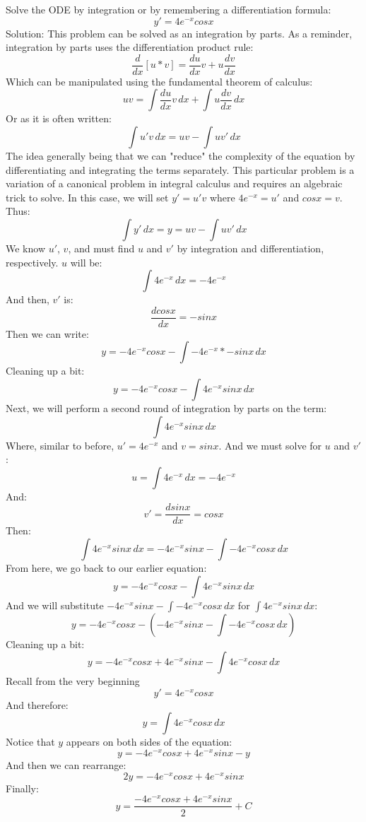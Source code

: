 \documentclass[12pt, letterpaper]{article}
\begin{document}
\setlength\parindent{0pt}
Solve the ODE by integration or by remembering a differentiation formula: 
\[ y' = 4e^{-x}cosx \]
Solution:
This problem can be solved as an integration by parts. As a reminder, integration by parts
uses the differentiation product rule:
\[ \frac{d}{dx}[u*v] = \frac{du}{dx}v + u\frac{dv}{dx} \]
Which can be manipulated using the fundamental theorem of calculus:
\[ uv = \int{\frac{du}{dx}v}\,dx + \int{u\frac{dv}{dx}}\,dx \]
Or as it is often written:
\[ \int{u'v}\,dx = uv - \int{uv'}\,dx \] 
The idea generally being that we can "reduce" the complexity of the equation by 
differentiating and integrating the terms separately. This particular problem is a 
variation of a canonical problem in integral calculus and requires an algebraic trick 
to solve.
In this case, we will set $y' = u'v$ where $4e^{-x} = u'$ and $cosx = v$. Thus:
\[ \int{y'}\,dx = y = uv - \int{uv'}\,dx \]
We know $u'$, $v$, and must find $u$ and $v'$ by integration and differentiation, 
respectively. $u$ will be:
\[ \int{4e^{-x}}\,dx = -4e^{-x} \]
And then, $v'$ is:
\[ \frac{dcosx}{dx} = -sinx \]
Then we can write:
\[ y = -4e^{-x}cosx - \int{-4e^{-x}*-sinx}\,dx \]
Cleaning up a bit:
\[ y = -4e^{-x}cosx - \int{4e^{-x}sinx}\,dx \]
Next, we will perform a second round of integration by parts on the term: 
\[ \int{4e^{-x}sinx}\,dx \]
Where, similar to before, $u' = 4e^{-x}$ and $v = sinx$. And we must solve for $u$ and $v'$:
\[ u = \int{4e^{-x}}\,dx = -4e^{-x} \]
And:
\[ v' = \frac{dsinx}{dx} = cosx \]
Then:
\[ \int{4e^{-x}sinx}\,dx = -4e^{-x}sinx - \int{-4e^{-x}cosx}\,dx \]
From here, we go back to our earlier equation:
\[ y = -4e^{-x}cosx - \int{4e^{-x}sinx}\,dx \]
And we will substitute $-4e^{-x}sinx - \int{-4e^{-x}cosx}\,dx$ for $\int{4e^{-x}sinx}\,dx$:
\[ y = -4e^{-x}cosx - (-4e^{-x}sinx - \int{-4e^{-x}cosx}\,dx) \]
Cleaning up a bit:
\[ y = -4e^{-x}cosx + 4e^{-x}sinx - \int{4e^{-x}cosx}\,dx \]
Recall from the very beginning 
\[ y' = 4e^{-x}cosx \]
And therefore:
\[ y = \int{4e^{-x}cosx}\,dx\]
Notice that $y$ appears on both sides of the equation:
\[ y = -4e^{-x}cosx + 4e^{-x}sinx - y \]
And then we can rearrange:
\[ 2y = -4e^{-x}cosx + 4e^{-x}sinx \]
Finally:
\[ y = \frac{-4e^{-x}cosx + 4e^{-x}sinx}{2} + C\]
\end{document}
